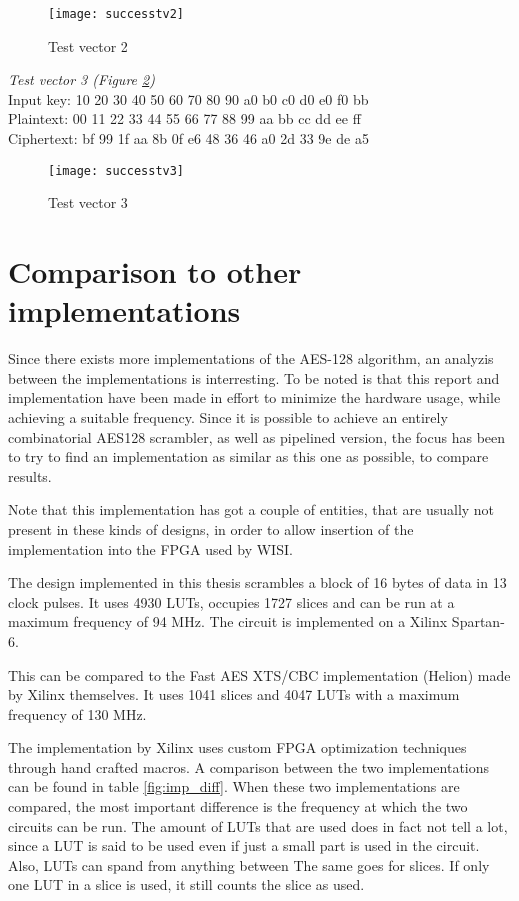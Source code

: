 \begin{figure}
  \texttt{[image: successtv2]}
  \caption{Test vector 2}
  \label{test:2}
\end{figure}

\emph{Test vector 3 (Figure \ref{test:3})} \\
Input key: 10 20 30 40 50 60 70 80 90 a0 b0 c0 d0 e0 f0 bb\\
Plaintext: 00 11 22 33 44 55 66 77 88 99 aa bb cc dd ee ff\\
Ciphertext: bf 99 1f aa 8b 0f e6 48 36 46 a0 2d 33 9e de a5

\begin{figure}
  \texttt{[image: successtv3]}
  \caption{Test vector 3}
  \label{test:3}
\end{figure}

\section{Comparison to other implementations}
Since there exists more implementations of the AES-128 algorithm, an 
analyzis between the implementations is interresting. To be noted is 
that this report and implementation have been made in effort to 
minimize the hardware usage, while achieving a suitable frequency.
Since it is possible to achieve an entirely combinatorial AES128 
scrambler, as well as pipelined version, the focus has been to try to 
find an implementation as similar as this one as possible, to compare 
results. 

Note that this implementation has got a couple of entities, that are 
usually not present in these kinds of designs, in order to allow 
insertion of the implementation into the FPGA used by WISI.

The design implemented in this thesis scrambles a block of 16 bytes 
of data in 13 clock pulses. It uses 4930 LUTs, occupies 1727 slices and 
can be run at a maximum frequency of 94 MHz. The circuit is implemented 
on a Xilinx Spartan-6.

This can be compared to the Fast AES XTS/CBC implementation (Helion) 
made by Xilinx themselves. It uses 1041 slices and 4047 LUTs with a 
maximum frequency of 130 MHz. \cite{Xilinx:AES} 

The implementation by Xilinx uses custom FPGA optimization techniques 
through hand crafted macros. A comparison between the two 
implementations can be found in table \ref{fig:imp_diff}. When these 
two implementations are compared, the most important difference is the 
frequency at which the two circuits can be run. The amount of LUTs that 
are used does in fact not tell a lot, since a LUT is said to be used
even if just a small part is used in the circuit. Also, LUTs can spand 
from anything between The same goes for slices. If only one LUT in a 
slice is used, it still counts the slice as used. 

